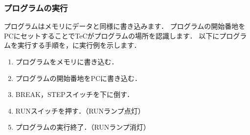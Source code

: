 \subsubsection{プログラムの実行}



プログラムはメモリにデータと同様に書き込みます．
プログラムの開始番地をPCにセットすることでTeCがプログラムの場所を認識します．
以下にプログラムを実行する手順を，に実行例を示します．

\begin{enumerate}
\item プログラムをメモリに書き込む．
\item プログラムの開始番地をPCに書き込む．
\item BREAK，STEPスイッチを下に倒す．
\item RUNスイッチを押す．（RUNランプ点灯）
\item プログラムの実行終了．（RUNランプ消灯）
\end{enumerate}

